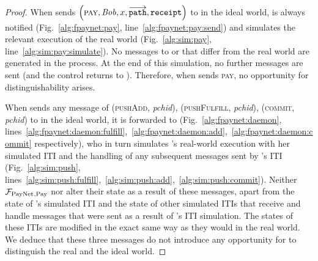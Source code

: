 \begin{proof}
  When \environment{} sends $\left(\textsc{pay}, \mathit{Bob}, x,
  \overrightarrow{\mathtt{path}}, \mathtt{receipt}\right)$ to \alice{} in the
  ideal world, \simulator{} is always notified (Fig.~\ref{alg:fpaynet:pay},
  line~\ref{alg:fpaynet:pay:send}) and simulates the relevant execution of the
  real world (Fig.~\ref{alg:sim:pay}, line~\ref{alg:sim:pay:simulate}). No
  messages to \ledger{} or \environment{} that differ from the real world are
  generated in the process. At the end of this simulation, no further messages
  are sent (and the control returns to \environment). Therefore, when
  \environment{} sends \textsc{pay}, no opportunity for distinguishability
  arises.

  When \environment{} sends any message of (\textsc{pushAdd}, \textit{pchid}),
  (\textsc{pushFulfill}, \textit{pchid}), (\textsc{commit}, \textit{pchid}) to
  \alice{} in the ideal world, it is forwarded to \simulator{}
  (Fig.~\ref{alg:fpaynet:daemon},
  lines~\ref{alg:fpaynet:daemon:fulfill},~\ref{alg:fpaynet:daemon:add},~\ref{alg:fpaynet:daemon:commit}
  respectively), who in turn simulates \alice's real-world execution with her
  simulated ITI and the handling of any subsequent messages sent by \alice's ITI
  (Fig.~\ref{alg:sim:push},
  lines~\ref{alg:sim:push:fulfill},~\ref{alg:sim:push:add},~\ref{alg:sim:push:commit}).
  Neither $\mathcal{F}_{\mathrm{PayNet}}{}_{\mathrm{, Pay}}$ nor \simulator{} alter their state as a
  result of these messages, apart from the state of \alice's simulated ITI and
  the state of other simulated ITIs that receive and handle messages that were
  sent as a result of \alice's ITI simulation. The states of these ITIs are
  modified in the exact same way as they would in the real world. We deduce that
  these three messages do not introduce any opportunity for \environment{} to
  distinguish the real and the ideal world.


\end{proof}
